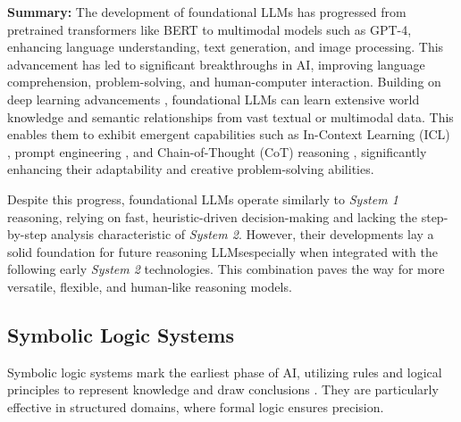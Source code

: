\noindent\textbf{Summary:} The development of foundational LLMs has progressed from pretrained transformers like BERT to multimodal models such as GPT-4, enhancing language understanding, text generation, and image processing. 
This advancement has led to significant breakthroughs in AI, improving language comprehension, problem-solving, and human-computer interaction. Building on deep learning advancements \cite{rumelhart1986learning, lecun1995convolutional, hochreiter1997long, hinton2006fast, hinton2006reducing, hinton2012deep, krizhevsky2012imagenet, DBLP:conf/emnlp/ChoMGBBSB14, sutskever2014sequence, srivastava2014dropout, kingma2014adam, lecun2015deep, he2016deep, huang2017densely,vaswani2017attention, goodfellow2020generative}, foundational LLMs can learn extensive world knowledge and semantic relationships from vast textual or multimodal data. This enables them to exhibit emergent capabilities such as In-Context Learning (ICL) \cite{min2022rethinking, dong2024survey}, prompt engineering \cite{white2023prompt, lester2021power}, and Chain-of-Thought (CoT) reasoning \cite{wei2022chain}, significantly enhancing their adaptability and creative problem-solving abilities.

Despite this progress, foundational LLMs operate similarly to \textit{System 1} reasoning, relying on fast, heuristic-driven decision-making and lacking the step-by-step analysis characteristic of \textit{System 2}. However, their developments lay a solid foundation for future reasoning LLMs\textendash especially when integrated with the following early \textit{System 2} technologies. This combination paves the way for more versatile, flexible, and human-like reasoning models.












\subsection{Symbolic Logic Systems}\label{symb_exp}


Symbolic logic systems mark the earliest phase of AI, utilizing rules and logical principles to represent knowledge and draw conclusions \cite{lewis1959symbolic, carnap2012introduction}. 
They are particularly effective in structured domains, where formal logic ensures precision.

